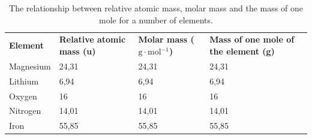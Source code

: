           \begin{table}[H]
        \begin{center}
      \label{m38717*uid11}
    \noindent
      \tablelasttail{}
      \begin{xtabular}[t]{|l|l|l|l|}\hline
                \textbf{Element}
               &
                \textbf{Relative atomic mass (u)}
               &
                \textbf{Molar mass ($\mathrm{g}\ensuremath{\cdot}\mathrm{mol}{}^{-1}$)}
               &
                \textbf{Mass of one mole of the element (g)}
     \tabularnewline{}
        Magnesium &
        24,31 &
        24,31 &
        24,31%
     \tabularnewline{}
        Lithium &
        6,94 &
        6,94 &
        6,94%
     \tabularnewline{}
        Oxygen &
        16 &
        16 &
        16%
     \tabularnewline{}
        Nitrogen &
        14,01 &
        14,01 &
        14,01%
     \tabularnewline{}
        Iron &
        55,85 &
        55,85 &
        55,85%
     \tabularnewline{}
    \end{xtabular}
      \end{center}
    \caption{The relationship between relative atomic mass, molar mass and the mass of one mole for a number of elements.}
\end{table}
    \par
\par
            \label{m38717*secfhsst!!!underscore!!!id209}\vspace{.5cm} 
